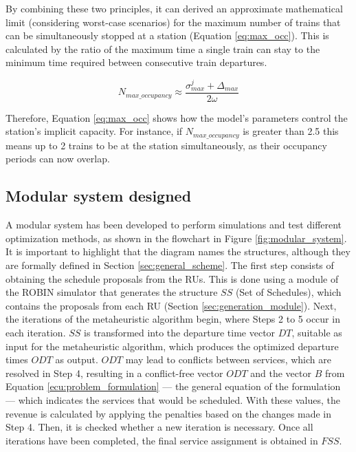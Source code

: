 \documentclass[Afour,sagev,times]{sagej}
\begin{document}
By combining these two principles, it can derived an approximate mathematical limit (considering worst-case scenarios) for the maximum number of trains that can be simultaneously stopped at a station (Equation \ref{eq:max_occ}). This is calculated by the ratio of the maximum time a single train can stay to the minimum time required between consecutive train departures.

\begin{equation}
N_{max\_occupancy} \approx \frac{\sigma_{max}^{j} + \Delta_{max}}{2\omega}
\label{eq:max_occ}
\end{equation}

Therefore, Equation \ref{eq:max_occ} shows how the model’s parameters control the station’s implicit capacity. For instance, if $N_{max\_occupancy}$ is greater than 2.5 this means up to 2 trains to be at the station simultaneously, as their occupancy periods can now overlap.

\subsection{Modular system designed}
\label{sec:modular_system_designed}

A modular system has been developed to perform simulations and test different optimization methods, as shown in the flowchart in Figure \ref{fig:modular_system}. It is important to highlight that the diagram names the structures, although they are formally defined in Section \ref{sec:general_scheme}. The first step consists of obtaining the schedule proposals from the RUs. This is done using a module of the ROBIN simulator that generates the structure $SS$ (Set of Schedules), which contains the proposals from each \gls{RU} (Section \ref{sec:generation_module}). Next, the iterations of the metaheuristic algorithm begin, where Steps 2 to 5 occur in each iteration. $SS$ is transformed into the departure time vector $DT$, suitable as input for the metaheuristic algorithm, which produces the optimized departure times $ODT$ as output. $ODT$ may lead to conflicts between services, which are resolved in Step 4, resulting in a conflict-free vector $ODT$ and the vector $B$ from Equation \ref{ecu:problem_formulation} — the general equation of the formulation — which indicates the services that would be scheduled. With these values, the revenue is calculated by applying the penalties based on the changes made in Step 4. Then, it is checked whether a new iteration is necessary. Once all iterations have been completed, the final service assignment is obtained in $FSS$.
\end{document}
